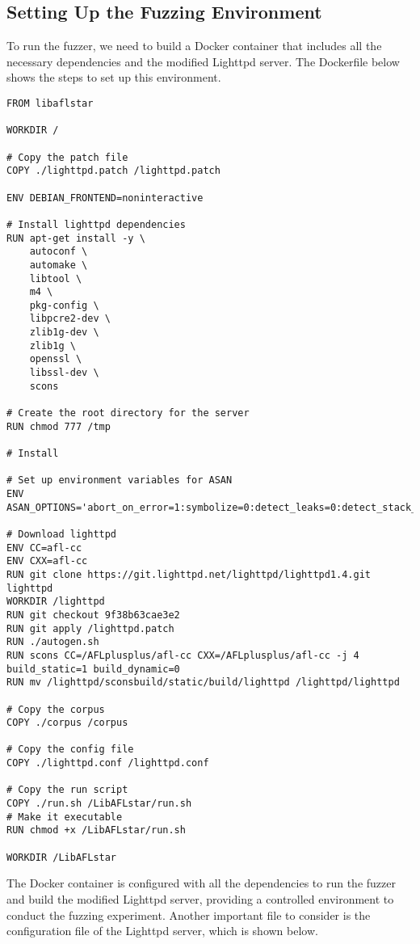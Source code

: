 \subsection{Setting Up the Fuzzing Environment}

To run the fuzzer, we need to build a Docker container that includes all the necessary dependencies and the modified Lighttpd server. The Dockerfile below shows the steps to set up this environment.

\begin{lstlisting}
FROM libaflstar 

WORKDIR /

# Copy the patch file
COPY ./lighttpd.patch /lighttpd.patch

ENV DEBIAN_FRONTEND=noninteractive

# Install lighttpd dependencies
RUN apt-get install -y \
    autoconf \
    automake \
    libtool \
    m4 \
    pkg-config \
    libpcre2-dev \
    zlib1g-dev \
    zlib1g \
    openssl \
    libssl-dev \
    scons

# Create the root directory for the server
RUN chmod 777 /tmp

# Install

# Set up environment variables for ASAN
ENV ASAN_OPTIONS='abort_on_error=1:symbolize=0:detect_leaks=0:detect_stack_use_after_return=1:detect_container_overflow=0:poison_array_cookie=0:malloc_fill_byte=0:max_malloc_fill_size=16777216'

# Download lighttpd
ENV CC=afl-cc
ENV CXX=afl-cc
RUN git clone https://git.lighttpd.net/lighttpd/lighttpd1.4.git lighttpd
WORKDIR /lighttpd 
RUN git checkout 9f38b63cae3e2
RUN git apply /lighttpd.patch
RUN ./autogen.sh  
RUN scons CC=/AFLplusplus/afl-cc CXX=/AFLplusplus/afl-cc -j 4 build_static=1 build_dynamic=0
RUN mv /lighttpd/sconsbuild/static/build/lighttpd /lighttpd/lighttpd

# Copy the corpus
COPY ./corpus /corpus

# Copy the config file
COPY ./lighttpd.conf /lighttpd.conf

# Copy the run script
COPY ./run.sh /LibAFLstar/run.sh
# Make it executable
RUN chmod +x /LibAFLstar/run.sh

WORKDIR /LibAFLstar
\end{lstlisting}
The Docker container is configured with all the dependencies to run the fuzzer and build the modified Lighttpd server, providing a controlled environment to conduct the fuzzing experiment.
Another important file to consider is the configuration file of the Lighttpd server, which is shown below.
